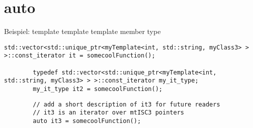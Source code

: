 \section{auto}

\begin{frame}[fragile]{Beispiel: template template template member type}
	\begin{lstlisting}[basicstyle=\tiny]
		std::vector<std::unique_ptr<myTemplate<int, std::string, myClass3> > >::const_iterator it = somecoolFunction();
		
		typedef std::vector<std::unique_ptr<myTemplate<int, std::string, myClass3> > >::const_iterator my_it_type;
		my_it_type it2 = somecoolFunction();
	\end{lstlisting}
	\begin{lstlisting}
		// add a short description of it3 for future readers
		// it3 is an iterator over mtISC3 pointers
		auto it3 = somecoolFunction();
	\end{lstlisting}
\end{frame}
